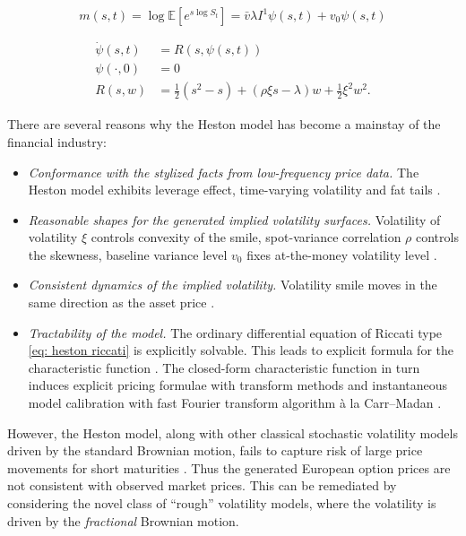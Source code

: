 \documentclass[12pt,twoside]{article}
\theoremstyle{plain}
\theoremstyle{plain}
\theoremstyle{definition}
\theoremstyle{remark}
\numberwithin{equation}{section}
\begin{document}
\begin{equation}
\label{eq: heston logarithm of moment-generating function}
m(s, t) = \log \mathbb{E}\left[e^{s \log S_{t}}\right]=\bar{v} \lambda I^{1} \psi(s, t)+v_{0} \psi(s, t) 
\end{equation}

\begin{equation}
\label{eq: heston riccati}
\begin{aligned}
\dot \psi(s,t) &= R(s, \psi(s, t)) \\
\psi(\cdot, 0) &= 0 \\[10pt]
R(s, w) &= \frac{1}{2}\left(s^{2}-s\right)+(\rho \xi s - \lambda) w+\frac{1}{2} \xi ^{2} w^{2}.
\end{aligned}
\end{equation}

\vspace{10pt}

There are several reasons why the Heston model has become a mainstay of the financial industry:

\begin{itemize}
    \item
    \textit{Conformance with the stylized facts from low-frequency price data.} The Heston model exhibits leverage effect, time-varying volatility and fat tails \cite{DY02}.
    \item
    \textit{Reasonable shapes for the generated implied volatility surfaces.} Volatility of volatility $\xi$ controls convexity of the smile, spot-variance correlation $\rho$ controls the skewness, baseline variance level $v_0$ fixes at-the-money volatility level \cite{FJL12}.
    \item \textit{Consistent dynamics of the implied volatility.} Volatility smile moves in the same direction as the asset price \cite{G11}.
    \item 
    \textit{Tractability of the model.} The ordinary differential equation of Riccati type \eqref{eq: heston riccati} is explicitly solvable. This leads to explicit formula for the characteristic function \cite{H93}. The closed-form characteristic function in turn induces explicit pricing formulae with transform methods and instantaneous model calibration with fast Fourier transform algorithm à la Carr–Madan \cite{L05, CM99}.
\end{itemize}

However, the Heston model, along with other classical stochastic volatility models driven by the standard Brownian motion, fails to capture risk of large price movements for short maturities \cite{J19}. Thus the generated European option prices are not consistent with observed market prices. This can be remediated by considering the novel class of ``rough'' volatility models, where the volatility is driven by the \emph{fractional} Brownian motion.
\end{document}
